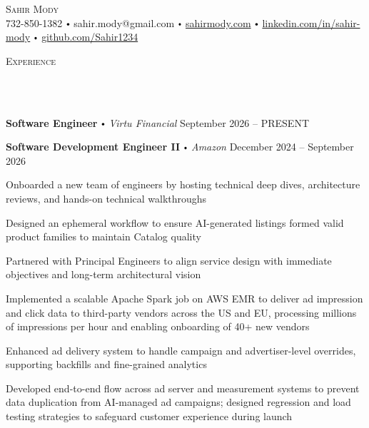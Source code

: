 \documentclass{article}
\newcommand{\contact}[3]{
\vspace*{3pt}
\begin{center}
{\Huge \scshape {#1}}\\
\vspace{0pt}
#2 
\vspace{0pt}
#3
\end{center}
\vspace*{-3pt}
}
\newcommand{\header}[1]{{
\hspace*{-15pt}\vspace*{10pt} \large \scshape{#1}} \vspace*{-6pt} 
\lineunder
}
\newcommand{\lineunder}{
\vspace*{-8pt} \\ \hspace*{-18pt} 
\hrulefill \\
}
\newcommand{\employer}[4]{
\textbf{#1} \labelitemi \textit{#2} \hfill #3 \\ #4 \vspace*{3pt}
}
\renewcommand{\labelitemi}{
$\vcenter{\hbox{\tiny$\bullet$}}$\hspace*{3pt}
}
\renewcommand{\labelitemii}{
$\vcenter{\hbox{\tiny$\bullet$}}$\hspace*{-3pt}
}
\newenvironment{bullet-list-minor}{
\begin{list}{\labelitemii}{\setlength\leftmargin{15pt} 
\topsep 0pt \itemsep 1pt}}{\vspace*{4pt}\end{list}
}
\begin{document}
\small
\vspace*{-64pt}

\contact{Sahir Mody}\bigskip
{{732-850-1382}\labelitemi{sahir.mody@gmail.com}\labelitemi\href{https://sahirmody.com}{sahirmody.com}\labelitemi\href{https://www.linkedin.com/in/sahir-mody}{linkedin.com/in/sahir-mody}  \labelitemi\href{https://www.github.com/Sahir1234}{github.com/Sahir1234}}
\medskip
\header{Experience}
    \vspace{8pt}
    \employer{Software Engineer}{Virtu Financial}{September 2026 -- PRESENT}{}
    \medskip
    \smallskip
    \employer{Software Development Engineer II}{Amazon}{December 2024 -- September 2026}{}
    \smallskip
    \begin{bullet-list-minor}
        \item Onboarded a new team of engineers by hosting technical deep dives, architecture reviews, and hands-on technical walkthroughs
        \item Designed an ephemeral workflow to ensure AI-generated listings formed valid product families to maintain Catalog quality
        \item Partnered with Principal Engineers to align service design with immediate objectives and long-term architectural vision
        \item Implemented a scalable Apache Spark job on AWS EMR to deliver ad impression and click data to third-party vendors across the US and EU, processing millions of impressions per hour and enabling onboarding of 40+ new vendors
        \item Enhanced ad delivery system to handle campaign and advertiser-level overrides, supporting backfills and fine-grained 
        analytics
        \item Developed end-to-end flow across ad server and measurement systems to prevent data duplication from AI-managed ad campaigns; designed regression and load testing strategies to safeguard customer experience during launch
    \end{bullet-list-minor}
    \medskip
    \smallskip
    
\end{document}
